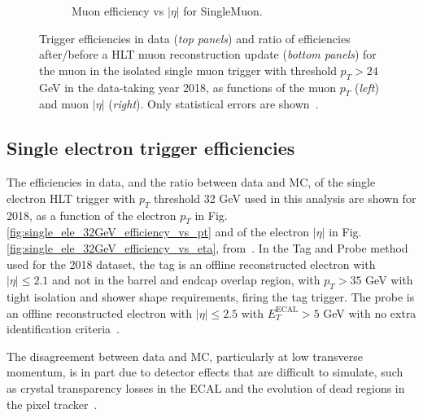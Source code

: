 \begin{figure}[ht]
\begin{subfigure}{0.45\textwidth}
        \caption{Muon efficiency vs $|\eta|$ for SingleMuon.}
        \label{fig:single_muon_24GeV_efficiency_vs_eta}
    \end{subfigure}
    \caption[Trigger efficiencies in data (\textit{top panels}) and ratio of efficiencies after/before a HLT muon reconstruction update (\textit{bottom panels}) for the muon in the isolated single muon trigger with threshold $p_{T} > 24$ GeV in the data-taking year 2018, as functions of the muon $p_{T}$ (\textit{left}) and muon $|\eta|$ (\textit{right}).]{Trigger efficiencies in data (\textit{top panels}) and ratio of efficiencies after/before a HLT muon reconstruction update (\textit{bottom panels}) for the muon in the isolated single muon trigger with threshold $p_{T} > 24$ GeV in the data-taking year 2018, as functions of the muon $p_{T}$ (\textit{left}) and muon $|\eta|$ (\textit{right}). Only statistical errors are shown~\cite{CMS-DP-2018-034}.} 
\end{figure}

\subsection{Single electron trigger efficiencies}

The efficiencies in data, and the ratio between data and MC, of the single electron HLT trigger with $p_{T}$ threshold 32 GeV used in this analysis are shown for 2018, as a function of the electron $p_{T}$ in Fig. \ref{fig:single_ele_32GeV_efficiency_vs_pt} and of the electron $|\eta|$ in Fig. \ref{fig:single_ele_32GeV_efficiency_vs_eta}, from~\cite{CMS-DP-2020-016}. In the Tag and Probe method used for the 2018 dataset, the tag is an offline reconstructed electron with $|\eta| \leq 2.1$ and not in the barrel and endcap overlap region, with $p_{T} > 35$ GeV with tight isolation and shower shape requirements, firing the tag trigger. The probe is an offline reconstructed electron with $|\eta| \leq 2.5$ with $E_T^\text{ECAL} > 5$ GeV with no extra identification criteria~\cite{CMS-DP-2020-016}. 

The disagreement between data and MC, particularly at low transverse momentum, is in part due to detector effects that are difficult to simulate, such as crystal transparency losses in the ECAL and the evolution of dead regions in the pixel tracker~\cite{CMS-DP-2020-016}.

